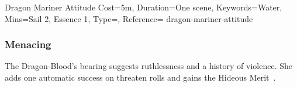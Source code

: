 \begin{Charm}{Dragon Mariner Attitude}{%
    Cost=5m,
    Duration=One scene,
    Keywords=Water,
    Mins={Sail 2, Essence 1},
    Type=\ReflexiveType,
    Reference=\cite*[p.~257]{db}
}{dragon-mariner-attitude}
    \subsubsection{Menacing}
    The Dragon-Blood's bearing suggests ruthlessness and a history of violence. She
    adds one automatic success on threaten rolls and gains the Hideous
    Merit~\parencite*[p.~162]{ex3}.
\end{Charm}


\printbibliography[title=References]


